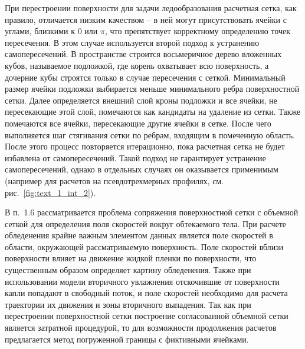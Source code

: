 \documentclass[a4paper,14pt]{extarticle}                     %
\theoremstyle{plain}                                         %
\begin{document}
При перестроении поверхности для задачи ледообразования расчетная сетка, как правило, отличается низким качеством -- в ней могут присутствовать ячейки с углами, близкими к $0$ или $\pi$, что препятствует корректному определению точек пересечения.
В этом случае используется второй подход к устранению самопересечений.
В пространстве строится восьмеричное дерево вложенных кубов, называемое подложкой, где корень охватывает всю поверхность, а дочерние кубы строятся только в случае пересечения с сеткой.
Минимальный размер ячейки подложки выбирается меньше минимального ребра поверхностной сетки.
Далее определяется внешний слой кроны подложки и все ячейки, не пересекающие этой слой, помечаются как кандидаты на удаление из сетки.
Также помечаются все ячейки, пересекающие другие ячейки в сетке.
После чего выполняется шаг стягивания сетки по ребрам, входящим в помеченную область.
После этого процесс повторяется итерационно, пока расчетная сетка не будет избавлена от самопересечений.
Такой подход не гарантирует устранение самопересечений, однако в отдельных случаях он оказывается применимым (например для расчетов на псевдотрехмерных профилях, см. рис.~\ref{fig:text_1_int_2}).


В п.~1.6 рассматривается проблема сопряжения поверхностной сетки с объемной сеткой для определения поля скоростей вокруг обтекаемого тела.
При расчете обледенения крайне важным элементом данных является поле скоростей в области, окружающей рассматриваемую поверхность.
Поле скоростей вблизи поверхности влияет на движение жидкой пленки по поверхности, что существенным образом определяет картину обледенения.
Также при использовании модели вторичного увлажнения отскочившие от поверхности капли попадают в свободный поток, и поле скоростей необходимо для расчета траектории их движения и зоны вторичного выпадения.
Так как при перестроении поверхностной сетки построение согласованной объемной сетки является затратной процедурой, то для возможности продолжения расчетов предлагается метод погруженной границы с фиктивными ячейками.

\end{document}
